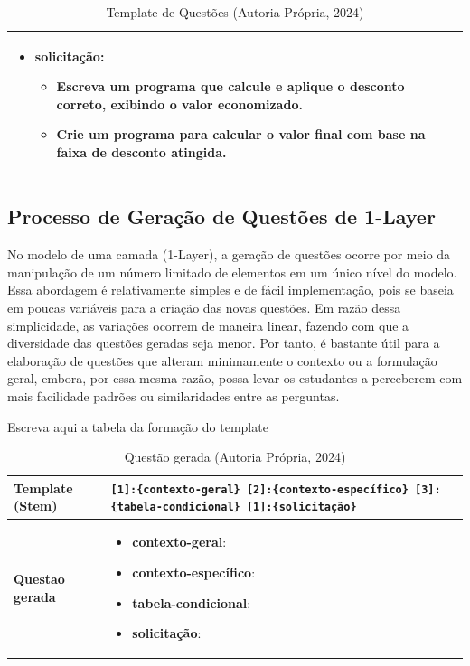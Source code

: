 \begin{table}[htbp]
\begin{tabular}{|l|p{10cm}|}
\begin{itemize}[leftmargin=1em]
  \item \textbf{solicitação}:
    \begin{itemize}[leftmargin=1em]
      \item Escreva um programa que calcule e aplique o desconto correto, exibindo o valor economizado.
      \item Crie um programa para calcular o valor final com base na faixa de desconto atingida.
    \end{itemize}
\end{itemize} \\
\hline

\end{tabular}
\caption{Template de Questões (Autoria Própria, 2024)}
\label{tab:template-questoes-elementos}
\end{table}




\subsection{Processo de Geração de Questões de 1-Layer}

No modelo de uma camada (1-Layer), a geração de questões ocorre por meio da manipulação de um número limitado de elementos em um único nível do modelo. Essa abordagem é relativamente simples e de fácil implementação, pois se baseia em poucas variáveis para a criação das novas questões. Em razão dessa simplicidade, as variações ocorrem de maneira linear, fazendo com que a diversidade das questões geradas seja menor. Por tanto, é bastante útil para a elaboração de questões que alteram minimamente o contexto ou a formulação geral, embora, por essa mesma razão, possa levar os estudantes a perceberem com mais facilidade padrões ou similaridades entre as perguntas.

Escreva aqui a tabela da formação do template



\begin{table}[htbp]
\centering
\begin{tabular}{|l|p{10cm}|}
\hline
\textbf{Template (Stem)} 
& \texttt{[1]:\{contexto-geral\} [2]:\{contexto-específico\} [3]:\{tabela-condicional\} [1]:\{solicitação\}} \\
\hline

\textbf{Questao gerada} 
& 
\begin{itemize}[leftmargin=1em]
  \item \textbf{contexto-geral}:

  \item \textbf{contexto-específico}:

  \item \textbf{tabela-condicional}:

  \item \textbf{solicitação}:
\end{itemize} \\
\hline

\end{tabular}
\caption{Questão gerada (Autoria Própria, 2024)}
\label{tab:questao-gerada}
\end{table}

